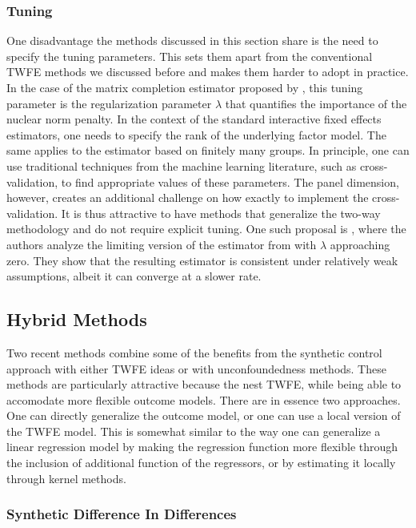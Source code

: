 \documentclass[letterpaper,12pt,leqno]{article}
\begin{document}
\subsubsection{Tuning}

One disadvantage the methods discussed in this section share is the need to specify the tuning parameters. This sets them apart from the conventional TWFE methods we discussed before and makes them harder to adopt in practice. In the case of the matrix completion estimator proposed by \citep*{athey2021matrix}, this tuning parameter is the regularization parameter $\lambda$ that quantifies the importance of the nuclear norm penalty. In the context of the standard interactive fixed effects estimators, one needs to specify the rank of the underlying factor model. The same applies to the estimator based on finitely many groups. In principle, one can use traditional techniques from the machine learning literature, such as cross-validation, to find appropriate values of these parameters. The panel dimension, however, creates an additional challenge on how exactly to implement the cross-validation.  It is thus attractive to have methods that generalize the two-way methodology and do not require explicit tuning. One such proposal is \citep{moon2018nuclear}, where the authors analyze the limiting version of the estimator from \citep*{athey2021matrix} with $\lambda$ approaching zero. They show that the resulting estimator is consistent under relatively weak assumptions, albeit it can converge at a slower rate. 




\subsection{Hybrid Methods}\label{section:hybrid}

Two recent methods combine some of the benefits from the synthetic control approach with either TWFE ideas or with unconfoundedness methods. These methods are particularly attractive because the nest TWFE, while being able to accomodate more flexible outcome models. There are in essence two approaches. One can directly generalize the outcome model, or one can use a local version of the TWFE model. This is somewhat  similar to the way one can generalize a linear regression model by making the regression function more flexible through the inclusion of additional function of the regressors, or by estimating it locally through kernel methods.

\subsubsection{Synthetic Difference In Differences}
\end{document}

